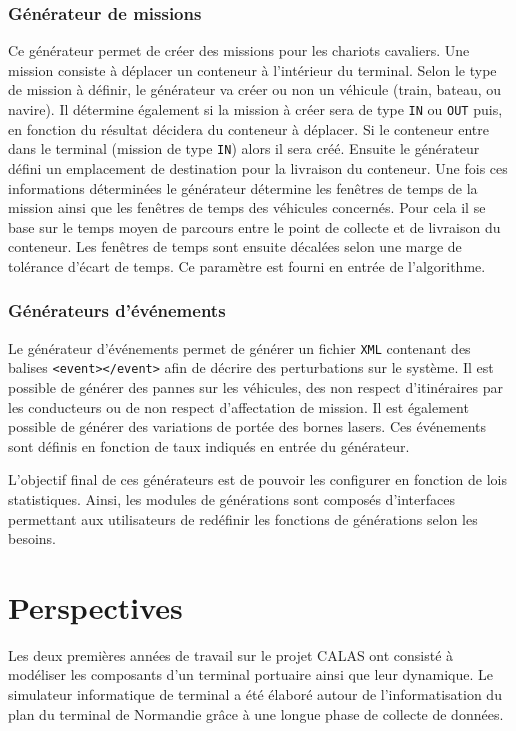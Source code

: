 \subsubsection{Générateur de missions}

Ce générateur permet de créer des missions pour les chariots cavaliers. Une mission consiste à déplacer un conteneur à l'intérieur du terminal. Selon le type de mission à définir, le générateur va créer ou non un véhicule (train, bateau, ou navire). Il détermine également si la mission à créer sera de type \verb!IN! ou \verb!OUT! puis, en fonction du résultat décidera du conteneur à déplacer. Si le conteneur entre dans le terminal (mission de type \verb!IN!) alors il sera créé. Ensuite le générateur défini un emplacement de destination pour la livraison du conteneur. Une fois ces informations déterminées le générateur détermine les fenêtres de temps de la mission ainsi que les fenêtres de temps des véhicules concernés. Pour cela il se base sur le temps moyen de parcours entre le point de collecte et de livraison du conteneur. Les fenêtres de temps sont ensuite décalées selon une marge de tolérance d'écart de temps. Ce paramètre est fourni en entrée de l'algorithme.

\subsubsection{Générateurs d'événements}

Le générateur d'événements permet de générer un fichier \verb!XML! contenant des balises \verb!<event>!\verb!</event>! afin de décrire des perturbations sur le système. Il est possible de générer des pannes sur les véhicules, des non respect d'itinéraires par les conducteurs ou de non respect d'affectation de mission. Il est également possible de générer des variations de portée des bornes lasers. Ces événements sont définis en fonction de taux indiqués en entrée du générateur.


L'objectif final de ces générateurs est de pouvoir les configurer en fonction de lois statistiques. Ainsi, les modules de générations sont composés d'interfaces permettant aux utilisateurs de redéfinir les fonctions de générations selon les besoins.

\section{Perspectives}

Les deux premières années de travail sur le projet CALAS ont consisté à modéliser les composants d'un terminal portuaire ainsi que leur dynamique. Le simulateur informatique de terminal a été élaboré autour de l'informatisation du plan du terminal de Normandie grâce à une longue phase de collecte de données.


